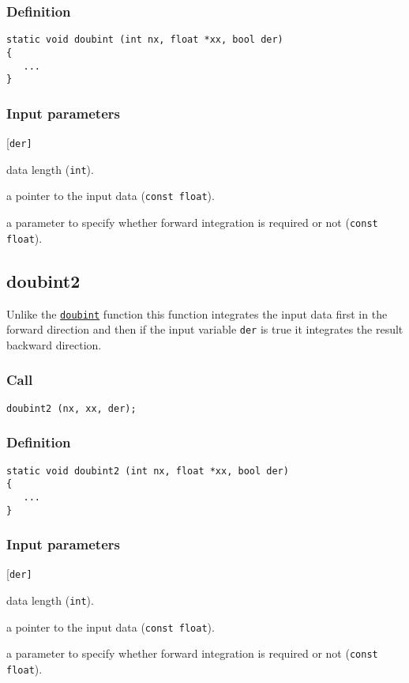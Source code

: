 \subsubsection*{Definition}
\begin{verbatim}
static void doubint (int nx, float *xx, bool der)
{
   ...
}
\end{verbatim}

\subsubsection*{Input parameters}
\begin{desclist}{\tt }{\quad}[\tt der]
   \setlength\itemsep{0pt}
   \item[nx]  data length (\texttt{int}). 
   \item[xx]  a pointer to the input data (\texttt{const float}). 
   \item[der] a parameter to specify whether forward integration is required or not (\texttt{const float}).  
\end{desclist}




\subsection{{doubint2}}\label{sec:doubint2}
Unlike the \hyperref[sec:doubint]{\texttt{doubint}} function this function integrates the input data first in the forward direction and then if the input variable \texttt{der} is true it integrates the result backward direction.   

\subsubsection*{Call}
\begin{verbatim}doubint2 (nx, xx, der);\end{verbatim}

\subsubsection*{Definition}
\begin{verbatim}
static void doubint2 (int nx, float *xx, bool der)
{
   ...
}
\end{verbatim}

\subsubsection*{Input parameters}
\begin{desclist}{\tt }{\quad}[\tt der]
   \setlength\itemsep{0pt}
   \item[nx]  data length (\texttt{int}). 
   \item[xx]  a pointer to the input data (\texttt{const float}). 
   \item[der] a parameter to specify whether forward integration is required or not (\texttt{const float}).  
\end{desclist}




